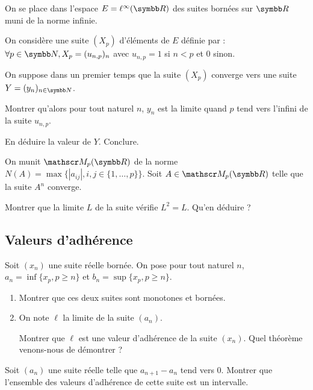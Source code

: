 \begin{exercice}
    On se place dans l'espace $E=\ell^{\infty}(\R)$ des suites bornées sur $\R$ muni de la norme infinie.

    On considère une suite $(X_{p})$ d'éléments de $E$ définie par : 
    $\forall p\in\N, X_{p}=(u_{n,p})_{n}$ avec $u_{n,p}=1$ si $n<p$ et $0$ sinon.

    On suppose dans un premier temps que la suite $(X_{p})$ converge vers une suite $Y=(y_{n})_{n\in\N}$.

    Montrer qu'alors pour tout naturel $n$, $y_{n}$ est la limite quand $p$ tend vers l'infini de la suite $u_{n,p}$.
    
    En déduire la valeur de $Y$. Conclure.
\end{exercice}

\begin{exercice}
    On munit $\mathscr M_{p}(\R)$ de la norme $N(A) = \max\{|a_{ij}|, i,j\in\{1,\dots,p\}\}$.
    Soit $A\in \mathscr M_{p}(\R)$ telle que la suite $A^{n}$ converge.

    Montrer que la limite $L$ de la suite vérifie $L^{2}=L$. Qu'en déduire ?
\end{exercice}

\subsection{Valeurs d'adhérence}

\begin{exercice}
    Soit $(x_{n})$ une suite réelle bornée. On pose pour tout naturel $n$,
    $a_{n}=\inf\{x_{p},p\geqslant n\}$ et $b_{n}=\sup\{x_{p},p\geqslant n\}$.
    \begin{enumerate}
        \item Montrer que ces deux suites sont monotones et bornées.
        \item On note $\ell$ la limite de la suite $(a_{n})$.
        
            Montrer que $\ell$ est une valeur d'adhérence de la suite $(x_{n})$.
            Quel théorème venons-nous de démontrer ?
    \end{enumerate}
\end{exercice}

\begin{exercice}
    Soit $(a_{n})$ une suite réelle telle que $a_{n+1}-a_{n}$ tend vers 0.
    Montrer que l'ensemble des valeurs d'adhérence de cette suite est un intervalle.
\end{exercice}

